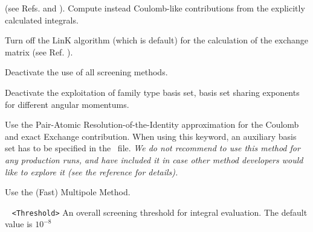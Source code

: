 \begin{description}
(see Refs. \cite{shao:425} and \cite{shao:6572}). Compute instead Coulomb-like contributions from the explicitly calculated integrals.
\item[\Key{NOLINK}] Turn off the LinK algorithm (which is default) for the calculation of the exchange matrix (see Ref. \cite{ochsenfeld:1663}).
\item[\Key{NO SCREEN}] Deactivate the use of all screening methods.
\item[\Key{NOFAMILY}] Deactivate the exploitation of family type basis set, basis set sharing exponents for different angular momentums.  
\item[\Key{PARI}] Use the Pair-Atomic Resolution-of-the-Identity
approximation \cite{PARI:2013} for the Coulomb and exact Exchange contribution.
When using this keyword, an auxiliary basis set has to be 
specified in the \mol\ file.\newline
\emph{We do not recommend to use this method for any production runs, and have included it 
in case other method developers would like to explore it (see the reference for details).}
\item[\Key{RUNMM}] Use the (Fast) Multipole Method.
\item[\Key{THRESH}]
\verb| | \newline
\verb|<Threshold>|\newline
An overall screening threshold for integral evaluation. The default value is $10^{-8}$


\end{description}
